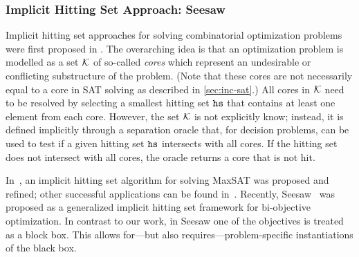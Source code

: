 \subsubsection{Implicit Hitting Set Approach: Seesaw\label{sec:seesaw}}



Implicit hitting set approaches for solving combinatorial optimization problems were first proposed in \textcite{DBLP:journals/ior/Moreno-CentenoK13}.
The overarching idea is that an optimization problem is modelled as a set $\mathcal{K}$ of so-called \emph{cores} which represent an undesirable or conflicting substructure of the problem.
(Note that these cores are not necessarily equal to a core in SAT solving as described in \cref{sec:inc-sat}.)
All cores in $\mathcal{K}$ need to be resolved by selecting a smallest hitting set $\texttt{hs}$ that contains at least one element from each core.
However, the set $\mathcal{K}$ is not explicitly know;
instead, it is defined implicitly through a separation oracle that, for decision problems, can be used to test if a given hitting set $\texttt{hs}$ intersects with all cores.
If the hitting set does not intersect with all cores, the oracle returns a core that is not hit.

In~\textcites{DBLP:conf/cp/DaviesB13,DBLP:conf/sat/DaviesB13,DBLP:conf/cp/DaviesB11,DBLP:conf/sat/BergBP20}, an implicit hitting set algorithm for solving MaxSAT was proposed and refined;
other successful applications can be found in~\textcites{DBLP:conf/cp/IgnatievPLM15,DBLP:conf/kr/SaikkoWJ16,DBLP:conf/cade/FazekasBB18,DBLP:conf/kr/SaikkoDAJ18}.
Recently, Seesaw~\autocite{DBLP:conf/cp/JanotaMSM21} was proposed as a generalized implicit hitting set framework for bi-objective optimization.
In contrast to our work, in Seesaw one of the objectives is treated as a block box.
This allows for---but also requires---problem-specific instantiations of the black box.

